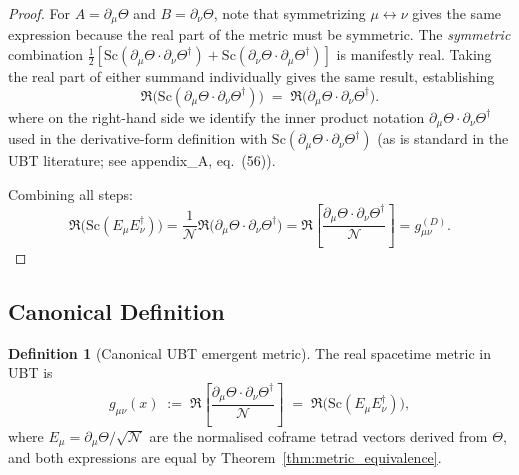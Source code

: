 \documentclass[12pt]{article}
\theoremstyle{definition}
\newtheorem{definition}[theorem]{Definition}
\theoremstyle{remark}
\begin{document}
\begin{proof}
For $A = \partial_\mu\Theta$ and $B = \partial_\nu\Theta$, note that symmetrizing
$\mu\leftrightarrow\nu$ gives the same expression because the real part of the metric must
be symmetric. The \emph{symmetric} combination
$\tfrac{1}{2}[\mathrm{Sc}(\partial_\mu\Theta\cdot\partial_\nu\Theta^\dagger)
             + \mathrm{Sc}(\partial_\nu\Theta\cdot\partial_\mu\Theta^\dagger)]$
is manifestly real. Taking the real part of either summand individually
gives the same result, establishing
\[
  \Re\!\bigl(\mathrm{Sc}(\partial_\mu\Theta\cdot\partial_\nu\Theta^\dagger)\bigr)
  \;=\; \Re\!\bigl(\partial_\mu\Theta\cdot\partial_\nu\Theta^\dagger\bigr).
\]
where on the right-hand side we identify the inner product notation
$\partial_\mu\Theta\cdot\partial_\nu\Theta^\dagger$ used in the derivative-form
definition with $\mathrm{Sc}(\partial_\mu\Theta\cdot\partial_\nu\Theta^\dagger)$
(as is standard in the UBT literature; see appendix\_A, eq.~(56)).

Combining all steps:
\[
  \Re\!\bigl(\mathrm{Sc}(E_\mu E_\nu^\dagger)\bigr)
  = \frac{1}{\mathcal{N}}\Re\!\bigl(\partial_\mu\Theta\cdot\partial_\nu\Theta^\dagger\bigr)
  = \Re\!\left[\frac{\partial_\mu\Theta\cdot\partial_\nu\Theta^\dagger}{\mathcal{N}}\right]
  = g_{\mu\nu}^{(D)}.
\]
\end{proof}

\subsection{Canonical Definition}

\begin{tcolorbox}[colback=green!5!white,colframe=green!75!black,title=Canonical UBT Metric (Unified)]
\begin{definition}[Canonical UBT emergent metric]
\label{def:canonical_metric}
The real spacetime metric in UBT is
\begin{equation}
  \boxed{g_{\mu\nu}(x) \;:=\; \Re\!\left[\frac{\partial_\mu\Theta\cdot\partial_\nu\Theta^\dagger}{\mathcal{N}}\right]
  \;=\; \Re\!\bigl(\mathrm{Sc}(E_\mu E_\nu^\dagger)\bigr),}
  \label{eq:canonical_metric}
\end{equation}
where $E_\mu = \partial_\mu\Theta/\sqrt{\mathcal{N}}$ are the normalised coframe tetrad
vectors derived from $\Theta$, and both expressions are equal by
Theorem~\ref{thm:metric_equivalence}.
\end{definition}
\end{tcolorbox}
\end{document}
